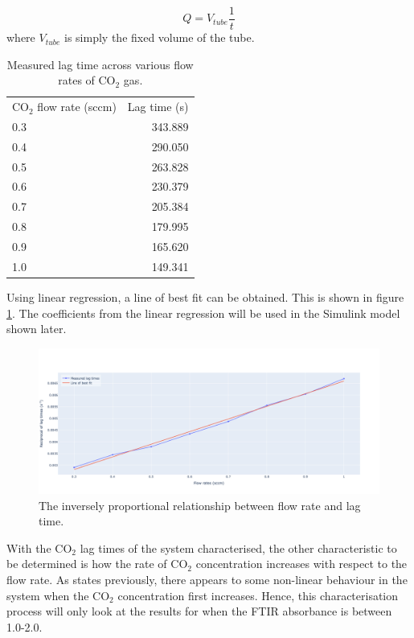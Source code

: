 \begin{equation}
    Q = V_{tube} \frac{1}{t}
\end{equation}
where $V_{tube}$ is simply the fixed volume of the tube.

\begin{table}[h!]
\centering
\caption{Measured lag time across various flow rates of CO$_2$ gas.}
\label{tb:inflection_time_measured}
\begin{tabular}{lr}
CO$_2$ flow rate (sccm) & Lag time (s) \\
0.3                  & 343.889             \\
0.4                  & 290.050             \\
0.5                  & 263.828             \\
0.6                  & 230.379             \\
0.7                  & 205.384             \\
0.8                  & 179.995             \\
0.9                  & 165.620             \\
1.0                  & 149.341            
\end{tabular}            
\end{table}

Using linear regression, a line of best fit can be obtained. This is shown in figure \ref{fig:inflection_times_best_fit}. The coefficients from the linear regression will be used in the Simulink model shown later.

\begin{figure}[h!]
	\centering
	\includegraphics[width=\linewidth]{chapter_5/figures/inflection_times_best_fit.png}
	\caption{The inversely proportional relationship between flow rate and lag time.}
	\label{fig:inflection_times_best_fit}
\end{figure}

With the CO$_2$ lag times of the system characterised, the other characteristic to be determined is how the rate of CO$_2$ concentration increases with respect to the flow rate. As states previously, there appears to some non-linear behaviour in the system when the CO$_2$ concentration first increases. Hence, this characterisation process will only look at the results for when the FTIR absorbance is between 1.0-2.0. 

